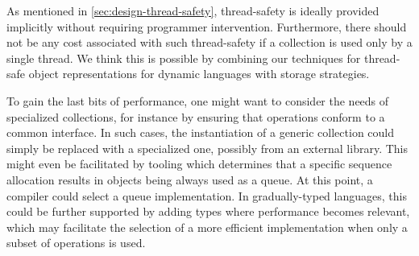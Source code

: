 \documentclass[sigconf, authorversion]{acmart}
\begin{document}

As mentioned in \cref{sec:design-thread-safety},
thread-safety is ideally provided implicitly
without requiring programmer intervention.
Furthermore, there should not be any cost associated with such thread-safety
if a collection is used only by a single thread.
We think this is possible by combining our techniques
for thread-safe object representations\citep{Daloze:2016:TSO}
for dynamic languages with storage strategies. %


To gain the last bits of performance,
one might want to consider the needs of specialized collections,
for instance by ensuring that operations conform to a common interface.
In such cases,
the instantiation of a generic collection could simply be replaced
with a specialized one, possibly from an external library.
This might even be facilitated by tooling
which determines that a specific sequence allocation results in objects being
always used as a queue.
At this point, a compiler could select a queue implementation.
In gradually-typed languages,
this could be further supported by adding types
where performance becomes relevant,
which may facilitate the selection of a more efficient implementation
when only a subset of operations is used.


%
\end{document}
